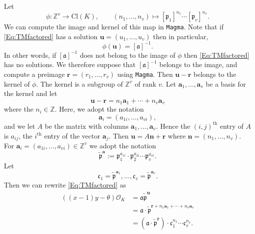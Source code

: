 {Let 
\[\phi : \mathbb{Z}^v \rightarrow \text{Cl}(K), \qquad (n_1,\dots ,n_v) \mapsto [\mathfrak{p}_1]^{n_1}\cdots [\mathfrak{p}_v]^{n_v}.\]
We can compute the image and kernel of this map in \texttt{Magma}. Note that if \eqref{Eq:TMfactored} has a solution $\mathbf{u}=(u_1,\dots, u_v)$ then in particular,
\[\phi(\mathbf{u})=[\mathfrak{a}]^{-1}.\]
In other words, if $[\mathfrak{a}]^{-1}$ does not belong to the image of $\phi$ then \eqref{Eq:TMfactored} has no solutions. We therefore suppose that $[\mathfrak{a}]^{-1}$ belongs to the image, and compute a preimage $\mathbf{r}=(r_1,\dotsc,r_v)$ using \texttt{Magma}. Then $\mathbf{u}-\mathbf{r}$ belongs to the kernel of $\phi$. The kernel is a subgroup of $\mathbb{Z}^v$ of rank $v$. Let $\mathbf{a}_1,\dots,\mathbf{a}_v$ be a basis for the kernel and let 
\[\mathbf{u}-\mathbf{r}=n_1 \mathbf{a}_1+\cdots + n_v \mathbf{a}_v\]
where the $n_i \in \mathbb{Z}$. Here, we adopt the notation
\[\mathbf{a}_i = (a_{1i}, \dots, a_{vi}),\]
and we let $A$ be the matrix with columns $\mathbf{a}_1,\dots,\mathbf{a}_v$. Hence the $(i,j)^{\text{th}}$ entry of $A$ is $a_{ij}$, the $i^{\text{th}}$ entry of the vector $\mathbf{a}_j$. Then $\mathbf{u}= A\mathbf{n}+\mathbf{r}$ where $\mathbf{n} = (n_1,\dots,n_v)$.
For $\mathbf{a}_i=(a_{1i},\dotsc,a_{vi}) \in \mathbb{Z}^v$ we adopt the notation 
\[\tilde{\mathfrak{p}}^\mathbf{a} :=\mathfrak{p}_1^{a_{1i}}\cdot \mathfrak{p}_2^{a_{2i}} \cdots \mathfrak{p}_v^{a_{vi}}.\]
Let
\[\mathfrak{c}_1= \tilde{\mathfrak{p}}^{\mathbf{a}_1},\dotsc,\mathfrak{c}_v= \tilde{\mathfrak{p}}^{\mathbf{a}_v}.\]
Then we can rewrite \eqref{Eq:TMfactored} as
\[\begin{array}{ll}
((x-1) y-\theta) \mathcal{O}_K 
	& = \mathfrak{a} \tilde{\mathfrak{p}}^{\mathbf{u}}\\ 
	& = \mathfrak{a} \cdot \tilde{\mathfrak{p}}^{\mathbf{r} + n_1 \mathbf{a}_1 + \cdots + n_v \mathbf{a}_v}\\
	& = (\mathfrak{a} \cdot \tilde{\mathfrak{p}}^\mathbf{r}) \cdot \mathfrak{c}_1^{n_1}\cdots \mathfrak{c}_v^{n_v}.
\end{array}\]

}
